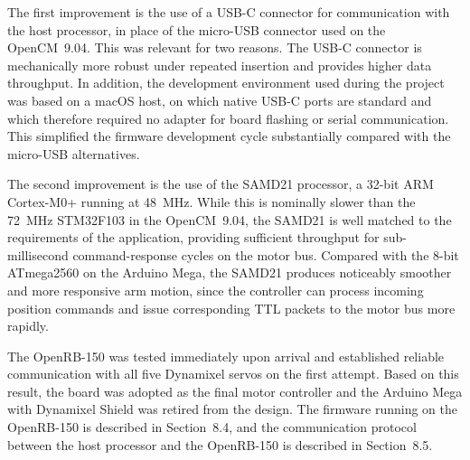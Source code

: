The first improvement is the use of a USB-C connector for 
communication with the host processor, in place of the micro-USB 
connector used on the OpenCM~9.04. This was relevant for two 
reasons. The USB-C connector is mechanically more robust under 
repeated insertion and provides higher data throughput. In 
addition, the development environment used during the project 
was based on a macOS host, on which native USB-C ports are 
standard and which therefore required no adapter for board 
flashing or serial communication. This simplified the firmware 
development cycle substantially compared with the micro-USB 
alternatives.

The second improvement is the use of the SAMD21 processor, a 
32-bit ARM Cortex-M0+ running at 48~MHz. While this is nominally 
slower than the 72~MHz STM32F103 in the OpenCM~9.04, the SAMD21 
is well matched to the requirements of the application, providing 
sufficient throughput for sub-millisecond command-response cycles 
on the motor bus. Compared with the 8-bit ATmega2560 on the 
Arduino Mega, the SAMD21 produces noticeably smoother and more 
responsive arm motion, since the controller can process incoming 
position commands and issue corresponding TTL packets to the 
motor bus more rapidly.

The OpenRB-150 was tested immediately upon arrival and 
established reliable communication with all five Dynamixel 
servos on the first attempt. Based on this result, the board was 
adopted as the final motor controller and the Arduino Mega with 
Dynamixel Shield was retired from the design. The firmware 
running on the OpenRB-150 is described in 
Section~8.4, and the communication 
protocol between the host processor and the OpenRB-150 is 
described in Section~8.5.